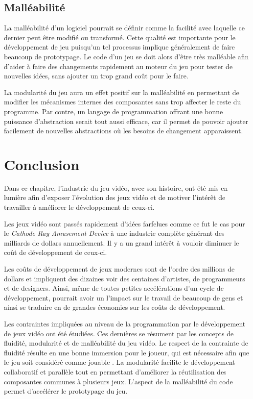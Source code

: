 \documentclass[12pt,twoside,letterpaper,francais]{book}
\begin{document}
\FloatBarrier
\subsection{Malléabilité}
La malléabilité d'un logiciel pourrait se définir comme la facilité
avec laquelle ce dernier peut être modifié ou transformé. Cette
qualité est importante pour le développement de jeu puisqu'un tel
processus implique généralement de faire beaucoup de prototypage. Le
code d'un jeu se doit alors d'être très malléable afin d'aider à faire
des changements rapidement au moteur du jeu pour tester de nouvelles
idées, sans ajouter un trop grand coût pour le faire.

La modularité du jeu aura un effet positif sur la malléabilité en
permettant de modifier les mécanismes internes des composantes sans
trop affecter le reste du programme. Par contre, un langage de
programmation offrant une bonne puissance d'abstraction serait tout
aussi efficace, car il permet de pouvoir ajouter facilement de
nouvelles abstractions où les besoins de changement apparaissent.


\FloatBarrier
\section{Conclusion}
Dans ce chapitre, l'industrie du jeu vidéo, avec son histoire, ont été
mis en lumière afin d'exposer l'évolution des jeux vidéo et de motiver
l'intérêt de travailler à améliorer le développement de ceux-ci.

Les jeux vidéo sont passés rapidement d'idées farfelues comme ce fut
le cas pour le \textit{Cathode Ray Amusement Device} à une industrie
complète générant des milliards de dollars annuellement. Il y a un
grand intérêt à vouloir diminuer le coût de développement de
ceux-ci. 

Les coûts de développement de jeux modernes sont de l'ordre des
millions de dollars et impliquent des dizaines voir des centaines
d'artistes, de programmeurs et de designers. Ainsi, même de toutes
petites accélérations d'un cycle de développement, pourrait avoir un
l'impact sur le travail de beaucoup de gens et ainsi se traduire en
de grandes économies sur les coûts de développement.

Les contraintes impliquées au niveau de la programmation par le
développement de jeux vidéo ont été étudiées. Ces dernières se
résument par les concepts de fluidité, modularité et de malléabilité
du jeu vidéo. Le respect de la contrainte de fluidité résulte en une
bonne immersion pour le joueur, qui est nécessaire afin que le jeu
soit considéré comme \og jouable \fg. La modularité facilite le
développement collaboratif et parallèle tout en permettant d'améliorer
la réutilisation des composantes communes à plusieurs jeux. L'aspect
de la malléabilité du code permet d'accélérer le prototypage du jeu.
\end{document}
